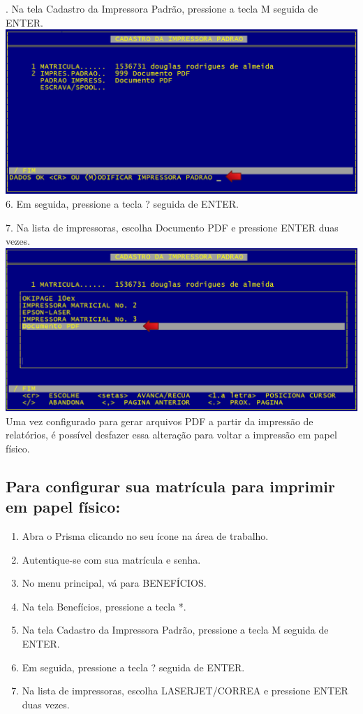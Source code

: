\documentclass[12pt,a4paper]{article}
\begin{document}
. Na tela Cadastro da Impressora Padrão, pressione a tecla M seguida de ENTER.\\
\includegraphics[width=1.0\textwidth, center]{modimpressora}\\

\vspace{0.3cm}
6. Em seguida, pressione a tecla ? seguida de ENTER.

7. Na lista de impressoras, escolha Documento PDF e pressione ENTER duas vezes.\\
\includegraphics[width=1.0\textwidth, center]{listaimpressoras}\\

\vspace{0.3cm}
\noindent Uma vez configurado para gerar arquivos PDF a partir da impressão de relatórios, é possível desfazer essa alteração para voltar a impressão em papel físico.

\subsection{Para configurar sua matrícula para imprimir em papel físico:}
\begin{enumerate}
  \item Abra o Prisma clicando no seu ícone na área de trabalho.
  \item Autentique-se com sua matrícula e senha.
  \item No menu principal, vá para BENEFÍCIOS.
  \item Na tela Benefícios, pressione a tecla *.
  \item Na tela Cadastro da Impressora Padrão, pressione a tecla M seguida de ENTER.
  \item Em seguida, pressione a tecla ? seguida de ENTER.
  \item Na lista de impressoras, escolha LASERJET/CORREA e pressione ENTER duas vezes.
\end{enumerate}
\end{document}
